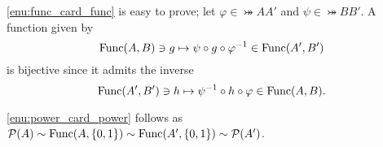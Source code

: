 \documentclass[a4paper,12pt]{article}
\begin{document}
\begin{prf}
	
	\ref{enu:func_card_func} is easy to prove;
	let \( \varphi \in \bij{A}{A'} \) and \( \psi \in \bij{B}{B'} \).
	A function given by
	\begin{equation*}
		\mathrm{Func}(A,B) \ni g \mapsto \psi \circ g \circ \varphi ^{-1} \in \mathrm{Func}(A',B')
	\end{equation*}
	is bijective since it admits the inverse
	\begin{equation*}
		\mathrm{Func}(A',B') \ni h \mapsto \psi^{-1} \circ h \circ \varphi \in \mathrm{Func}(A,B).
	\end{equation*}
	
	\ref{enu:power_card_power} follows as 
	\( \mathcal{P}(A)
	\sim \mathrm{Func}(A,\left\{ 0,1 \right\})
	\sim \mathrm{Func}(A',\left\{ 0,1 \right\})
	\sim \mathcal{P}(A')
	\).
\end{prf}
\end{document}
